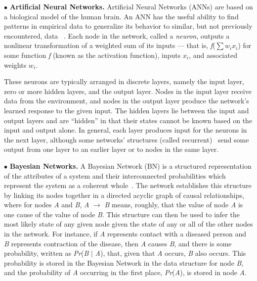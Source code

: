\documentclass[conference]{IEEEtran}
\begin{document}
$\bullet$ {\bf Artificial Neural Networks.}
Artificial Neural Networks (ANNs) are
based on a biological model
of the human brain. An ANN has the useful ability to find patterns in empirical data
to generalize its behavior to similar, but not previously encountered, data ~\cite{Philips-Wren:12}.
Each
node in the network, called a \emph{neuron}, outputs a nonlinear transformation of a weighted
sum of its inputs --- that is, \emph{f}($\sum$$w_i$$x_i$) for some function \emph{f}
(known as the activation function), inputs $x_i$, and associated weights $w_i$.

These neurons are
typically arranged in discrete layers, namely the input layer, zero or more hidden
layers, and the output layer. Nodes in the input layer receive data from the
environment, and nodes in the output layer produce the network's learned response to
the given input. The hidden layers lie between the input and output layers and are
``hidden'' in that their states cannot be known based on the input and output alone. In
general, each layer produces input for the neurons in the next layer, although some
networks' structures (called recurrent)~\cite{Philips-Wren:12} send some output from one layer to an earlier layer or to nodes in the same layer.

$\bullet$ {\bf Bayesian Networks.} A Bayesian Network (BN) is a structured representation of the attributes of a system and their interconnected probabilities which represent the system as a coherent whole~\cite{Darwiche:10}.
The network establishes this structure by linking its nodes together in a directed acyclic graph of causal relationships, where for nodes \emph{A} and \emph{B}, \emph{A} $\rightarrow$ \emph{B} means, roughly, that the value of node \emph{A} is one cause of the value of node \emph{B}.
This  structure can then be used to infer the most likely state of any given node given the state of any or all of the other nodes in the network. For instance, if \emph{A} represents contact  with a diseased person and \emph{B} represents contraction of the  disease, then \emph{A} causes \emph{B}, and there is some probability, written as \emph{Pr}(\emph{B} $|$ \emph{A}), that, given that \emph{A} occurs, \emph{B} also occurs. This probability is stored in the Bayesian Network in the data structure for node \emph{B}, and the probability of \emph{A} occurring in the first place, \emph{Pr}(\emph{A}), is stored in node \emph{A}.
\end{document}

